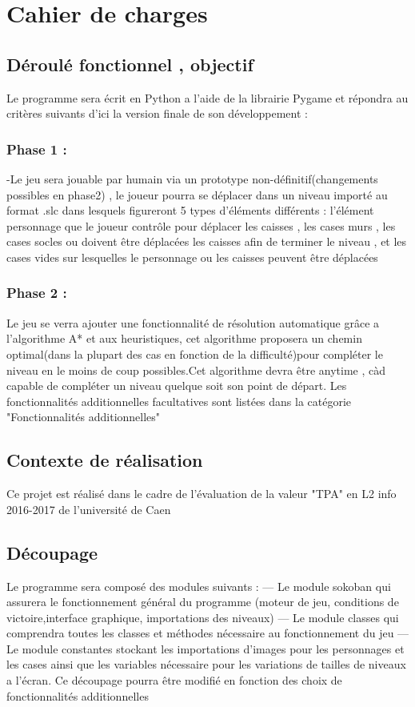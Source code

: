 \documentclass{article}
\begin{document}
	\section{Cahier de charges}
		\subsection{Déroulé fonctionnel , objectif}
		Le programme sera écrit en Python a l’aide de la librairie Pygame et répondra
au critères suivants d’ici la version finale de son développement :
			\subsubsection{Phase 1 :}
			-Le jeu sera jouable par humain via un prototype non-définitif(changements
possibles en phase2) , le joueur pourra se déplacer dans un niveau importé
au format .slc dans lesquels figureront 5 types d’éléments différents : l’élément
personnage que le joueur contrôle pour déplacer les caisses , les cases murs , les
cases socles ou doivent être déplacées les caisses afin de terminer le niveau , et
les cases vides sur lesquelles le personnage ou les caisses peuvent être déplacées
			\subsubsection{Phase 2 :}
			Le jeu se verra ajouter une fonctionnalité de résolution automatique grâce
a l’algorithme A* et aux heuristiques, cet algorithme proposera un chemin optimal(dans
la plupart des cas en fonction de la difficulté)pour compléter le niveau
en le moins de coup possibles.Cet algorithme devra être anytime , càd capable
de compléter un niveau quelque soit son point de départ.
Les fonctionnalités additionnelles facultatives sont listées dans la catégorie
"Fonctionnalités additionnelles"
		\subsection{Contexte de réalisation}
		Ce projet est réalisé dans le cadre de l’évaluation de la valeur "TPA" en L2
info 2016-2017 de l’université de Caen
		\subsection{Découpage}
		Le programme sera composé des modules suivants :
— Le module sokoban qui assurera le fonctionnement général du programme
(moteur de jeu, conditions de victoire,interface graphique, importations
des niveaux)
— Le module classes qui comprendra toutes les classes et méthodes nécessaire
au fonctionnement du jeu
— Le module constantes stockant les importations d’images pour les personnages
et les cases ainsi que les variables nécessaire pour les variations
de tailles de niveaux a l’écran.
Ce découpage pourra être modifié en fonction des choix de fonctionnalités additionnelles
\end{document}
